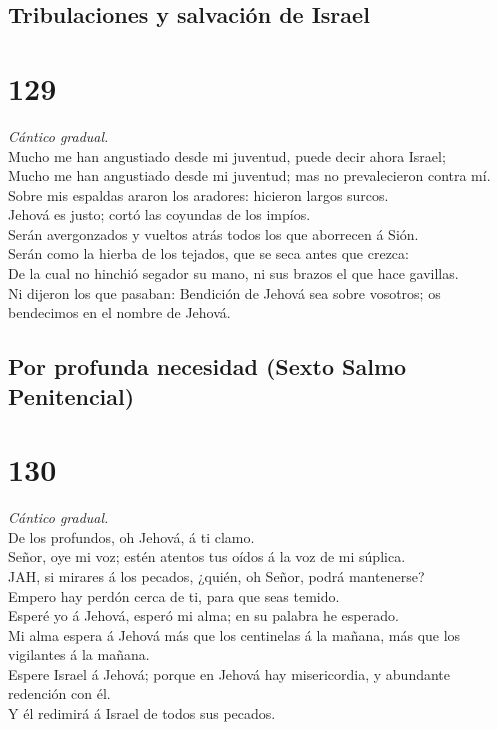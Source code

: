 \hypertarget{tribulaciones-y-salvaciuxf3n-de-israel}{%
\subsection{Tribulaciones y salvación de
Israel}\label{tribulaciones-y-salvaciuxf3n-de-israel}}

\hypertarget{section-128}{%
\section{129}\label{section-128}}

 \emph{Cántico gradual.}\\
Mucho me han angustiado desde mi juventud, puede decir ahora Israel;\\
 Mucho me han angustiado desde mi juventud; mas no
prevalecieron contra mí.\\
 Sobre mis espaldas araron los aradores: hicieron largos
surcos.\\
 Jehová es justo; cortó las coyundas de los impíos.\\
 Serán avergonzados y vueltos atrás todos los que aborrecen
á Sión.\\
 Serán como la hierba de los tejados, que se seca antes que
crezca:\\
 De la cual no hinchió segador su mano, ni sus brazos el que
hace gavillas.\\
 Ni dijeron los que pasaban: Bendición de Jehová sea sobre
vosotros; os bendecimos en el nombre de Jehová.

\hypertarget{por-profunda-necesidad-sexto-salmo-penitencial}{%
\subsection{Por profunda necesidad (Sexto Salmo
Penitencial)}\label{por-profunda-necesidad-sexto-salmo-penitencial}}

\hypertarget{section-129}{%
\section{130}\label{section-129}}

 \emph{Cántico gradual.}\\
De los profundos, oh Jehová, á ti clamo.\\
 Señor, oye mi voz; estén atentos tus oídos á la voz de mi
súplica.\\
 JAH, si mirares á los pecados, ¿quién, oh Señor, podrá
mantenerse?\\
 Empero hay perdón cerca de ti, para que seas temido.\\
 Esperé yo á Jehová, esperó mi alma; en su palabra he
esperado.\\
 Mi alma espera á Jehová más que los centinelas á la mañana,
más que los vigilantes á la mañana.\\
 Espere Israel á Jehová; porque en Jehová hay misericordia,
y abundante redención con él.\\
 Y él redimirá á Israel de todos sus pecados.


